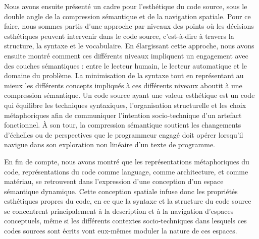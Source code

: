 \documentclass{article}
\begin{document}
Nous avons ensuite présenté un cadre pour l'esthétique du code source, sous le double angle de la compression sémantique et de la navigation spatiale. Pour ce faire, nous sommes partis d'une approche par niveaux des points où les décisions esthétiques peuvent intervenir dans le code source, c'est-à-dire à travers la structure, la syntaxe et le vocabulaire. En élargissant cette approche, nous avons ensuite montré comment ces différents niveaux impliquent un engagement avec des couches sémantiques : entre le lecteur humain, le lecteur automatique et le domaine du problème. La minimisation de la syntaxe tout en représentant au mieux les différents concepts impliqués à ces différents niveaux aboutit à une compression sémantique. Un code source ayant une valeur esthétique est un code qui équilibre les techniques syntaxiques, l'organisation structurelle et les choix métaphoriques afin de communiquer l'intention socio-technique d'un artefact fonctionnel. À son tour, la compression sémantique soutient les changements d'échelles ou de perspectives que le programmeur engagé doit opérer lorsqu'il navigue dans son exploration non linéaire d'un texte de programme.

En fin de compte, nous avons montré que les représentations métaphoriques du code, représentations du code comme language, comme architecture, et comme matériau, se retrouvent dans l'expression d'une conception d'un espace sémantique dynamique. Cette conception spatiale infuse donc les propriétés esthétiques propres du code, en ce que la syntaxe et la structure du code source se concentrent principalement à la description et à la navigation d'espaces conceptuels, même si les différents contextes socio-techniques dans lesquels ces codes sources sont écrits vont eux-mêmes moduler la nature de ces espaces.


\pagebreak



\end{document}
